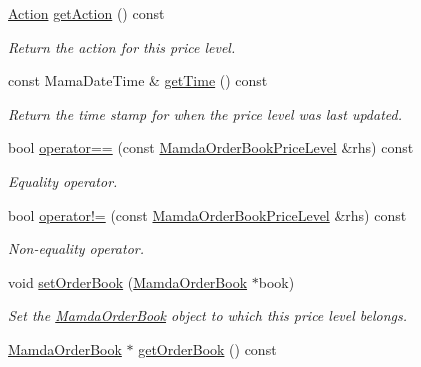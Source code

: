 \begin{CompactItemize}
\hyperlink{classWombat_1_1MamdaOrderBookPriceLevel_bd3407b4250fc6f7a42d94b6d32e358a}{Action} \hyperlink{classWombat_1_1MamdaOrderBookPriceLevel_232ee2c842b179c9bf8084f0760a0674}{get\-Action} () const 
\begin{CompactList}\small\item\em Return the action for this price level. \item\end{CompactList}\item 
const Mama\-Date\-Time \& \hyperlink{classWombat_1_1MamdaOrderBookPriceLevel_344d4b52029e4c28fe27ae3e0729f7a6}{get\-Time} () const 
\begin{CompactList}\small\item\em Return the time stamp for when the price level was last updated. \item\end{CompactList}\item 
bool \hyperlink{classWombat_1_1MamdaOrderBookPriceLevel_604035ac59f06cfd410fe793b53ee4b8}{operator==} (const \hyperlink{classWombat_1_1MamdaOrderBookPriceLevel}{Mamda\-Order\-Book\-Price\-Level} \&rhs) const 
\begin{CompactList}\small\item\em Equality operator. \item\end{CompactList}\item 
bool \hyperlink{classWombat_1_1MamdaOrderBookPriceLevel_d315992c34dd1ffd704186fe8b2c8bb2}{operator!=} (const \hyperlink{classWombat_1_1MamdaOrderBookPriceLevel}{Mamda\-Order\-Book\-Price\-Level} \&rhs) const 
\begin{CompactList}\small\item\em Non-equality operator. \item\end{CompactList}\item 
void \hyperlink{classWombat_1_1MamdaOrderBookPriceLevel_c70687d7df55a6fff9d09d685ff3762e}{set\-Order\-Book} (\hyperlink{classWombat_1_1MamdaOrderBook}{Mamda\-Order\-Book} $\ast$book)
\begin{CompactList}\small\item\em Set the \hyperlink{classWombat_1_1MamdaOrderBook}{Mamda\-Order\-Book} object to which this price level belongs. \item\end{CompactList}\item 
\hyperlink{classWombat_1_1MamdaOrderBook}{Mamda\-Order\-Book} $\ast$ \hyperlink{classWombat_1_1MamdaOrderBookPriceLevel_db787cef3be753da0c212480f1b6b643}{get\-Order\-Book} () const 

\end{CompactItemize}
